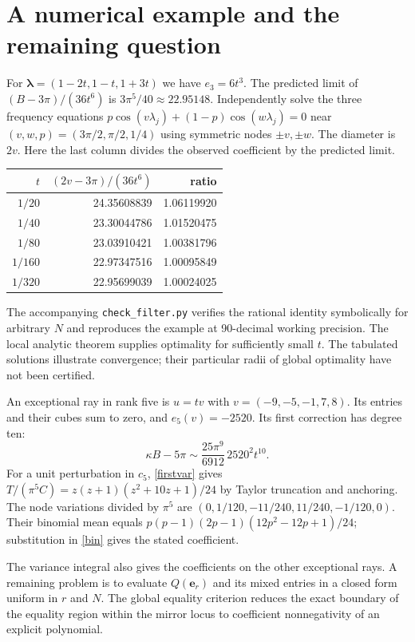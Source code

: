\documentclass[11pt]{article}
\begin{document}
\section{A numerical example and the remaining question}
For $\boldsymbol\lambda=(1-2t,1-t,1+3t)$ we have $e_3=6t^3$.
The predicted limit of $(B-3\pi)/(36t^6)$ is $3\pi^5/40\approx22.95148$.
Independently solve the three frequency equations
$p\cos(v\lambda_j)+(1-p)\cos(w\lambda_j)=0$ near
$(v,w,p)=(3\pi/2,\pi/2,1/4)$ using symmetric nodes $\pm v,\pm w$.
The diameter is $2v$. Here the last column divides the observed coefficient
by the predicted limit.
\begin{center}
\begin{tabular}{rrr}\toprule
$t$&$(2v-3\pi)/(36t^6)$&ratio\\\midrule
$1/20$&24.35608839&1.06119920\\
$1/40$&23.30044786&1.01520475\\
$1/80$&23.03910421&1.00381796\\
$1/160$&22.97347516&1.00095849\\
$1/320$&22.95699039&1.00024025\\\bottomrule
\end{tabular}
\end{center}
The accompanying \texttt{check\_filter.py} verifies the rational identity
symbolically for arbitrary $N$ and reproduces the example at 90-decimal
working precision. The local analytic theorem supplies optimality for
sufficiently small $t$. The tabulated solutions illustrate convergence;
their particular radii of global optimality have not been certified.

An exceptional ray in rank five is $u=tv$ with
$v=(-9,-5,-1,7,8)$. Its entries and their cubes sum to zero, and
$e_5(v)=-2520$. Its first correction has degree ten:
\[
 \kappa B-5\pi\sim \frac{25\pi^9}{6912}\,2520^2 t^{10}.
\]
For a unit perturbation in $c_5$, \eqref{firstvar} gives
$T/(\pi^5 C)=z(z+1)(z^2+10z+1)/24$ by Taylor truncation and anchoring.
The node variations divided by $\pi^5$ are
$(0,1/120,-11/240,11/240,-1/120,0)$.
Their binomial mean equals $p(p-1)(2p-1)(12p^2-12p+1)/24$;
substitution in \eqref{bin} gives the stated coefficient.

The variance integral also gives the coefficients on the other exceptional rays.
A remaining problem is to evaluate $Q(\mathbf e_r)$ and its mixed entries
in a closed form uniform in $r$ and $N$. The global equality criterion
reduces the exact boundary of the equality region within the mirror locus
to coefficient nonnegativity of an explicit polynomial.
\end{document}
